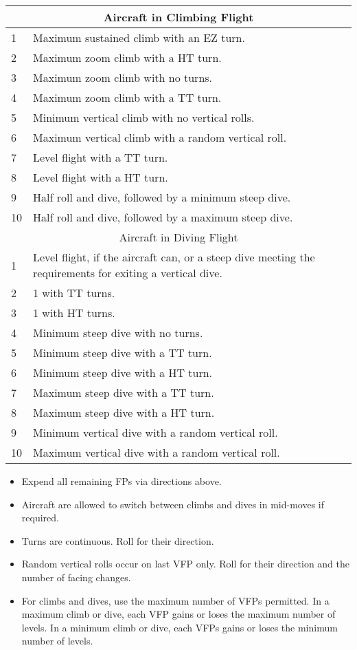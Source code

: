 \begin{onecolumntable}
{\begin{tabularx}{\linewidth}{lX}
\midrule
\multicolumn{2}{c}{Aircraft in Climbing Flight}\\
\midrule
1   &Maximum sustained climb with an EZ turn.\\
2   &Maximum zoom climb with a HT turn.\\
3   &Maximum zoom climb with no turns.\\
4   &Maximum zoom climb with a TT turn.\\
5   &Minimum vertical climb with no vertical rolls.\\
6   &Maximum vertical climb with a random vertical roll.\\
7   &Level flight with a TT turn.\\
8   &Level flight with a HT turn.\\
9   &Half roll and dive, followed by a minimum steep dive.\\
10  &Half roll and dive, followed by a maximum steep dive.\\
\midrule
\multicolumn{2}{c}{Aircraft in Diving Flight}\\
\midrule
1   &Level flight, if the aircraft can, or a steep dive meeting the requirements for exiting a vertical dive.\\
2   &1 with TT turns.\\
3   &1 with HT turns.\\
4   &Minimum steep dive with no turns.\\
5   &Minimum steep dive with a TT turn.\\
6   &Minimum steep dive with a HT turn.\\
7   &Maximum steep dive with a TT turn.\\
8   &Maximum steep dive with a HT turn.\\
9   &Minimum vertical dive with a random vertical roll.\\
10  &Maximum vertical dive with a random vertical roll.\\
\bottomrule
\end{tabularx}
\begin{tablenote}{\linewidth}
\begin{itemize}
    \item Expend all remaining FPs via directions above.
    \item Aircraft are allowed to switch between climbs and dives in mid-moves if required. 
    \item Turns are continuous. Roll for their direction. 
    \item Random vertical rolls occur on last VFP only. Roll for their direction and the number of facing changes.
    \item For climbs and dives, use the maximum number of VFPs permitted. In a maximum climb or dive, each VFP gains or loses the maximum number of levels. In a minimum climb or dive, each VFPs gains or loses the minimum number of levels.
\end{itemize}
\end{tablenote}

}

\end{onecolumntable}
